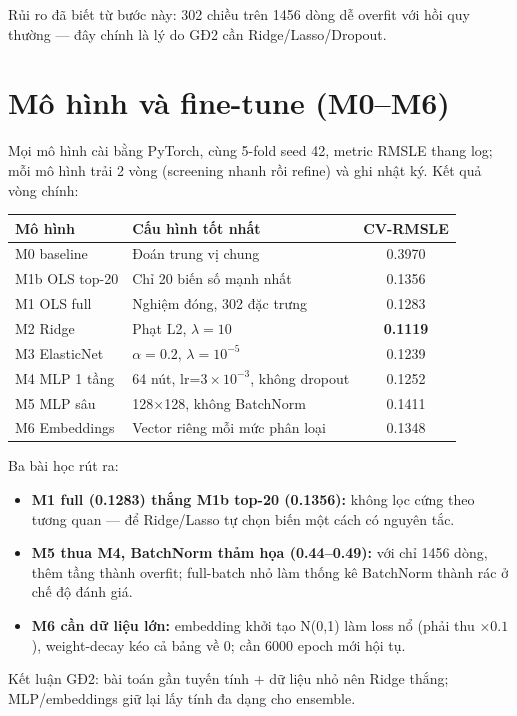 \documentclass[a4paper,13pt]{article}
\begin{document}
Rủi ro đã biết từ bước này: 302 chiều trên 1456 dòng dễ overfit với hồi quy thường —
đây chính là lý do GĐ2 cần Ridge/Lasso/Dropout.

\newpage
\section{Mô hình và fine-tune (M0--M6)}

Mọi mô hình cài bằng PyTorch, cùng 5-fold seed 42, metric RMSLE thang log; mỗi mô hình
trải 2 vòng (screening nhanh rồi refine) và ghi nhật ký. Kết quả vòng chính:

\begin{center}
{\small
\begin{tabular}{|l|l|c|}
\hline
\textbf{Mô hình} & \textbf{Cấu hình tốt nhất} & \textbf{CV-RMSLE} \\
\hline
M0 baseline & Đoán trung vị chung & 0.3970 \\
M1b OLS top-20 & Chỉ 20 biến số mạnh nhất & 0.1356 \\
M1 OLS full & Nghiệm đóng, 302 đặc trưng & 0.1283 \\
M2 Ridge & Phạt L2, $\lambda=10$ & \textbf{0.1119} \\
M3 ElasticNet & $\alpha=0.2$, $\lambda=10^{-5}$ & 0.1239 \\
M4 MLP 1 tầng & 64 nút, lr=$3\times10^{-3}$, không dropout & 0.1252 \\
M5 MLP sâu & 128$\times$128, không BatchNorm & 0.1411 \\
M6 Embeddings & Vector riêng mỗi mức phân loại & 0.1348 \\
\hline
\end{tabular}
}
\end{center}

Ba bài học rút ra:
\begin{itemize}
  \item \textbf{M1 full (0.1283) thắng M1b top-20 (0.1356):} không lọc cứng theo tương
        quan — để Ridge/Lasso tự chọn biến một cách có nguyên tắc.
  \item \textbf{M5 thua M4, BatchNorm thảm họa (0.44--0.49):} với chỉ 1456 dòng, thêm tầng
        thành overfit; full-batch nhỏ làm thống kê BatchNorm thành rác ở chế độ đánh giá.
  \item \textbf{M6 cần dữ liệu lớn:} embedding khởi tạo N(0,1) làm loss nổ (phải thu
        $\times 0.1$), weight-decay kéo cả bảng về 0; cần 6000 epoch mới hội tụ.
\end{itemize}
Kết luận GĐ2: bài toán gần tuyến tính + dữ liệu nhỏ nên Ridge thắng; MLP/embeddings giữ
lại lấy tính đa dạng cho ensemble.
\end{document}
